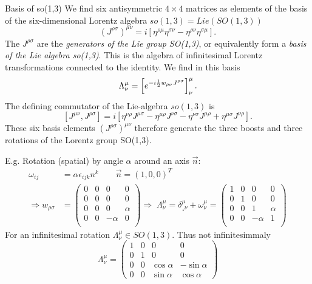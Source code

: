 \begin{mybox}{Basis of so(1,3)}
	We find six antisymmetric $4\times4$ matrices as elements of the basis of the six-dimensional Lorentz algebra $so(1,3)=Lie(SO(1,3))$
	\begin{equation}
	(J^{\rho  \sigma})^{\mu \nu} = i \left[\eta^{\rho \mu} \eta^{\sigma \nu} - \eta^{\rho \nu} \eta^{\sigma \mu} \right].
	\end{equation}
	The $J^{\rho \sigma}$ are the \emph{generators of the Lie group SO(1,3)}, or equivalently form a \emph{basis of the Lie algebra so(1,3)}. This is the algebra of infinitesimal Lorentz transformations connected to the identity. We find in this basis
	\begin{equation}
	\Lambda^{\mu}_{\nu} = \left[e^{-i \frac{1}{2} w_{\rho \sigma }J^{\rho \sigma}  }\right]^{\mu}_{\nu}.
	\end{equation}
	The defining commutator of the Lie-algebra $so(1,3)$ is 
	\begin{equation}
	\label{eq:commutatorso3}
	[J^{\mu \nu}, J^{\rho \sigma} ] = i \left[\eta^{\nu \rho} J^{\mu \sigma} - \eta^{\mu \rho} J^{\nu \sigma} - \eta^{\nu \sigma} J^{\mu \rho} + \eta^{\mu \sigma} J^{\nu \rho}\right].
	\end{equation}
	These six basis elements $(J^{\rho \sigma})^{\mu \nu}$ therefore generate the three boosts and three rotations of the Lorentz group SO(1,3).
\end{mybox}

E.g. Rotation (spatial) by angle $\alpha$ around an axis $\vec{n}$:
\begin{align*}
	\omega_{ij} &= \alpha \epsilon_{ijk} n^k \qquad \vec{n} = (1,0,0)^T\\
	\Rightarrow 	w_{\rho \sigma} &=
	\begin{pmatrix}
		0&0&0&0\\
		0&0&0&0 \\
		0&0&0&\alpha \\
		0&0&-\alpha &0\\
	\end{pmatrix}
	\Rightarrow \; \Lambda^{\mu}_{\nu} = \delta^{\mu}_{¸\nu} + \omega^{\mu}_{\nu} = 
	\begin{pmatrix}
		1 &0&0&0\\
		0&1&0&0 \\
		0&0&1&\alpha \\
		0&0&-\alpha &1 \\
	\end{pmatrix}
\end{align*}
For an infinitesimal rotation $\Lambda^{\mu}_{\nu} \in SO(1,3)$. Thus not infinitesimmaly
\begin{equation}
\Lambda^{\mu}_{\nu} = 
\begin{pmatrix}
1&0&0&0\\
0&1&0&0 \\
0&0& \cos \alpha & -\sin \alpha \\
0&0& \sin\alpha & \cos \alpha
\end{pmatrix}
\end{equation}


